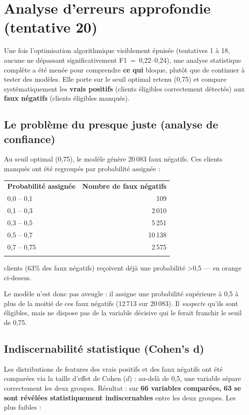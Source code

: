 \documentclass[11pt,a4paper]{report}
\let\oldtoprule\toprule
\renewcommand{\toprule}{\arrayrulecolor{corpslate}\oldtoprule\arrayrulecolor{black}}
\let\oldmidrule\midrule
\renewcommand{\midrule}{\arrayrulecolor{emsigreen}\oldmidrule\arrayrulecolor{black}}
\let\oldbottomrule\bottomrule
\renewcommand{\bottomrule}{\arrayrulecolor{corpslate}\oldbottomrule\arrayrulecolor{black}}
\begin{document}
\section{Analyse d'erreurs approfondie (tentative 20)}
\statutFait{}
Une fois l'optimisation algorithmique visiblement épuisée (tentatives
1 à 18, aucune ne dépassant significativement F1~=~0,22--0,24), une
analyse statistique complète a été menée pour comprendre \textbf{ce qui}
bloque, plutôt que de continuer à tester des modèles. Elle porte sur le
seuil optimal retenu (0,75) et compare systématiquement les
\textbf{vrais positifs} (clients éligibles correctement détectés) aux
\textbf{faux négatifs} (clients éligibles manqués).

\subsection{Le problème du \og presque juste \fg{} (analyse de confiance)}
Au seuil optimal (0,75), le modèle génère 20\,083 faux négatifs. Ces
clients manqués ont été regroupés par probabilité assignée :

\begin{center}
\begin{tabular}{@{}lr@{}}
\toprule
\rowcolor{corpslate!10}
\textbf{Probabilité assignée} & \textbf{Nombre de faux négatifs} \\
\midrule
0,0 -- 0,1 & 109 \\
0,1 -- 0,3 & 2\,010 \\
0,3 -- 0,5 & 5\,251 \\
\rowcolor{bcporange!10} 0,5 -- 0,7 & 10\,138 \\
\rowcolor{bcporange!10} 0,7 -- 0,75 & 2\,575 \\
\bottomrule
\end{tabular}
\end{center}
{\small\color{corpslate}  clients (63\% des faux négatifs) reçoivent déjà une probabilité \textgreater 0,5 — en orange ci-dessus.}

Le modèle n'est donc pas \og aveugle \fg{} : il assigne une probabilité
supérieure à 0,5 à plus de la moitié de ces faux négatifs (12\,713 sur
20\,083). Il \textit{suspecte} qu'ils sont éligibles, mais ne dispose pas
de la variable décisive qui le ferait franchir le seuil de 0,75.

\subsection{Indiscernabilité statistique (Cohen's d)}
Les distributions de features des vrais positifs et des faux négatifs ont
été comparées via la taille d'effet de Cohen ($d$) : au-delà de 0,5, une
variable sépare correctement les deux groupes. Résultat : sur
\textbf{66 variables comparées, 63 se sont révélées statistiquement
indiscernables} entre les deux groupes. Les plus faibles :
\end{document}
